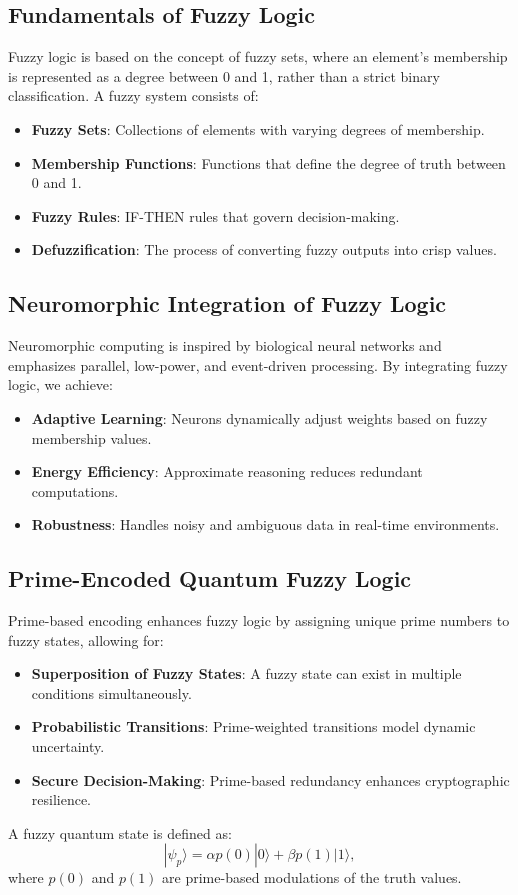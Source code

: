 \documentclass{article}
\theoremstyle{plain}
\begin{document}
\begin{itemize}
\begin{itemize}
\subsection{Fundamentals of Fuzzy Logic}
Fuzzy logic is based on the concept of fuzzy sets, where an element's membership is represented as a degree between 0 and 1, rather than a strict binary classification. A fuzzy system consists of:
\begin{itemize}
    \item \textbf{Fuzzy Sets}: Collections of elements with varying degrees of membership.
    \item \textbf{Membership Functions}: Functions that define the degree of truth between 0 and 1.
    \item \textbf{Fuzzy Rules}: IF-THEN rules that govern decision-making.
    \item \textbf{Defuzzification}: The process of converting fuzzy outputs into crisp values.
\end{itemize}

\subsection{Neuromorphic Integration of Fuzzy Logic}
Neuromorphic computing is inspired by biological neural networks and emphasizes parallel, low-power, and event-driven processing. By integrating fuzzy logic, we achieve:
\begin{itemize}
    \item \textbf{Adaptive Learning}: Neurons dynamically adjust weights based on fuzzy membership values.
    \item \textbf{Energy Efficiency}: Approximate reasoning reduces redundant computations.
    \item \textbf{Robustness}: Handles noisy and ambiguous data in real-time environments.
\end{itemize}

\subsection{Prime-Encoded Quantum Fuzzy Logic}
Prime-based encoding enhances fuzzy logic by assigning unique prime numbers to fuzzy states, allowing for:
\begin{itemize}
    \item \textbf{Superposition of Fuzzy States}: A fuzzy state can exist in multiple conditions simultaneously.
    \item \textbf{Probabilistic Transitions}: Prime-weighted transitions model dynamic uncertainty.
    \item \textbf{Secure Decision-Making}: Prime-based redundancy enhances cryptographic resilience.
\end{itemize}
A fuzzy quantum state is defined as:
\begin{equation}
    |\psi_p\rangle = \alpha p(0)|0\rangle + \beta p(1)|1\rangle,
\end{equation}
where $p(0)$ and $p(1)$ are prime-based modulations of the truth values.


\end{itemize}
\end{itemize}
\end{document}
